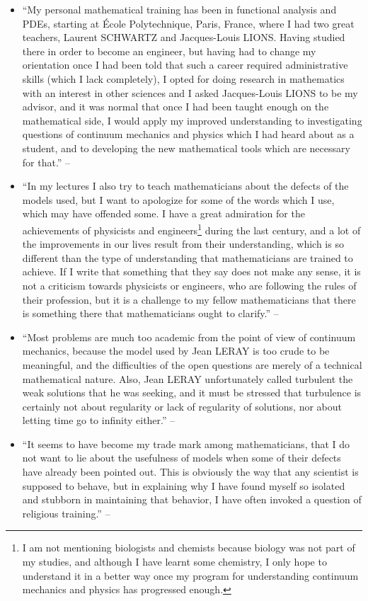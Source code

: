 \documentclass[oneside]{book}
\numberwithin{equation}{section}
\begin{document}
\begin{enumerate}
\begin{itemize}
		\item ``My personal mathematical training has been in functional analysis and PDEs, starting at \'Ecole Polytechnique, Paris, France, where I had two great teachers, Laurent SCHWARTZ and Jacques-Louis LIONS. Having studied there in order to become an engineer, but having had to change my orientation once I had been told that such a career required administrative skills (which I lack completely), I opted for doing research in mathematics with an interest in other sciences and I asked Jacques-Louis LIONS to be my advisor, and it was normal that once I had been taught enough on the mathematical side, I would apply my improved understanding to investigating questions of continuum mechanics and physics which I had heard about as a student, and to developing the new mathematical tools which are necessary for that.'' -- \cite[Preface, p. xiii]{Tartar2006}
		\item ``In my lectures I also try to teach mathematicians about the defects of the models used, but I want to apologize for some of the words which I use, which may have offended some. I have a great admiration for the achievements of physicists and engineers\footnote{I am not mentioning biologists and chemists because biology was not part of my studies, and although I have learnt some chemistry, I only hope to understand it in a better way once my program for understanding continuum mechanics and physics has progressed enough.} during the last century, and a lot of the improvements in our lives result from their understanding, which is so different than the type of understanding that mathematicians are trained to achieve. If I write that something that they say does not make any sense, it is not a criticism towards physicists or engineers, who are following the rules of their profession, but it is a challenge to my fellow mathematicians that there is something there that mathematicians ought to clarify.'' -- \cite[Preface, p. xiii]{Tartar2006}
		\item ``Most problems are much too academic from the point of view of continuum mechanics, because the model used by Jean LERAY is too crude to be meaningful, and the difficulties of the open questions are merely of a technical mathematical nature. Also, Jean LERAY unfortunately called turbulent the weak solutions that he was seeking, and it must be stressed that turbulence is certainly not about regularity or lack of regularity of solutions, nor about letting time go to infinity either.'' -- \cite[Introduction, p. xv]{Tartar2006}
		\item ``It seems to have become my trade mark among mathematicians, that I do not want to lie about the usefulness of models when some of their defects have already been pointed out. This is obviously the way that any scientist is supposed to behave, but in explaining why I have found myself so isolated and stubborn in maintaining that behavior, I have often invoked a question of religious training.'' -- \cite[Introduction, p. xvi]{Tartar2006}

\end{itemize}
\end{enumerate}
\end{document}
